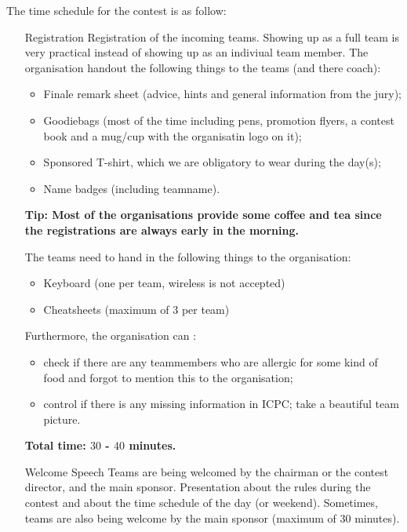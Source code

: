 The time schedule for the contest is as follow:
\begin{itemize}
\item[Registration] Registration of the incoming teams. Showing up as a full team is very practical instead of showing up as an indiviual team member. The organisation handout the following things to the teams (and there coach):
\begin{itemize}
\item Finale remark sheet (advice, hints and general information from the jury);
\item Goodiebags (most of the time including pens, promotion flyers, a contest book and a mug/cup with the organisatin logo on it);
\item Sponsored T-shirt, which we are obligatory to wear during the day(s);
\item Name badges (including teamname).
\end{itemize}
\textbf{Tip: Most of the organisations provide some coffee and tea since the registrations are always early in the morning.}

The teams need to hand in the following things to the organisation:
\begin{itemize}
\item Keyboard (one per team, wireless is not accepted)
\item Cheatsheets (maximum of $3$ per team)
\end{itemize}

Furthermore, the organisation can :
\begin{itemize}
\item check if there are any teammembers who are allergic for some kind of food and forgot to mention this to the organisation;
\item control if there is any missing information in ICPC;
\utem take a beautiful team picture.
\end{itemize}

\textbf{Total time: $30$ - $40$ minutes.}

\item[Welcome Speech] Teams are being welcomed by the chairman or the contest director, and the main sponsor. Presentation about the rules during the contest and about the time schedule of the day (or weekend). Sometimes, teams are also being welcome by the main sponsor (maximum of $30$ minutes).


\end{itemize}
